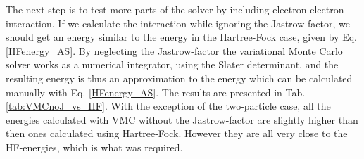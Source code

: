 	\begin{table}
		\begin{centering}
		\par\end{centering}

		\protect\caption{Results from VMC calculations without electron-electron interaction. $N$ is number of particles used in the quantum dot, and $\omega$ is the frequency of the harmonic oscillator. Results for both two dimensional cases and three dimensional cases are tested. For reference the exact energies are given in column $\mbox{E}_{0}$.  \label{tab:VMC_no_interaction}}
	\end{table}

	The next step is to test more parts of the solver by including electron-electron interaction. If we calculate the interaction while ignoring the Jastrow-factor, we should get an energy similar to the energy in the Hartree-Fock case, given by Eq. \eqref{HFenergy_AS}. By neglecting the Jastrow-factor the variational Monte Carlo solver works as a numerical integrator, using the Slater determinant, and the resulting energy is thus an approximation to the energy which can be calculated manually with Eq. \eqref{HFenergy_AS}. The results are presented in Tab. \ref{tab:VMCnoJ_vs_HF}. With the exception of the two-particle case, all the energies calculated with VMC without the Jastrow-factor are slightly higher than then ones calculated using Hartree-Fock. However they are all very close to the HF-energies, which is what was required.

